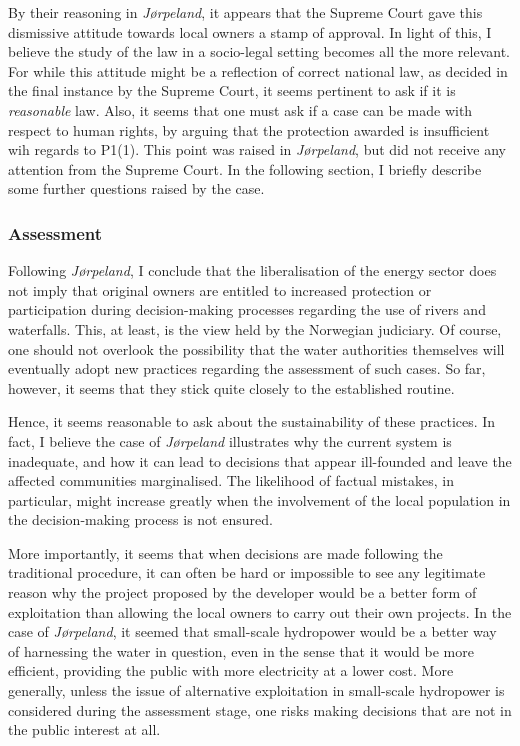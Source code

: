 By their reasoning in \emph{Jørpeland}, it appears that the Supreme Court gave this dismissive attitude towards local owners a stamp of approval. In light of this, I believe the study of the law in a socio-legal setting becomes all the more relevant. For while this attitude might be a reflection of correct national law, as decided in the final instance by the Supreme Court, it seems pertinent to ask if it is \emph{reasonable} law. Also, it seems that one must ask if a case can be made with respect to human rights, by arguing that the protection awarded is insufficient wih regards to P1(1). This point was raised in \emph{Jørpeland}, but did not receive any attention from the Supreme Court. In the following section, I briefly describe some further questions raised by the case.

\subsubsection{Assessment}

Following \emph{Jørpeland}, I conclude that the liberalisation of the energy sector does not imply that original owners are entitled to increased protection or participation during decision-making processes regarding the use of rivers and waterfalls. This, at least, is the view held by the Norwegian judiciary. Of course, one should not overlook the possibility that the water authorities themselves will eventually adopt new practices regarding the assessment of such cases. So far, however, it seems that they stick quite closely to the established routine.

Hence, it seems reasonable to ask about the sustainability of these practices. In fact, I believe the case of \emph{Jørpeland} illustrates why the current system is inadequate, and how it can lead to decisions that appear ill-founded and leave the affected communities marginalised. The likelihood of factual mistakes, in particular, might increase greatly when the involvement of the local population in the decision-making process is not ensured.

More importantly, it seems that when decisions are made following the traditional procedure, it can often be hard or impossible to see any legitimate reason why the project proposed by the developer would be a better form of exploitation than allowing the local owners to carry out their own projects. In the case of \emph{Jørpeland}, it seemed that small-scale hydropower would be a better way of harnessing the water in question, even in the sense that it would be more efficient, providing the public with more electricity at a lower cost. More generally, unless the issue of alternative exploitation in small-scale hydropower is considered during the assessment stage, one risks making decisions that are not in the public interest at all. 

